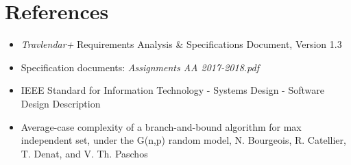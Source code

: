 \section{References}
\begin{itemize}
    \item \emph{Travlendar+} Requirements Analysis \& Specifications Document, Version 1.3
    \item Specification documents: \emph{Assignments AA 2017-2018.pdf}
    \item IEEE Standard for Information Technology - Systems Design - Software Design Description
    
    \item Average-case complexity of a branch-and-bound algorithm for max independent set, under the G(n,p) random model, 
N. Bourgeois, R. Catellier, T. Denat, and V. Th. Paschos
\end{itemize}